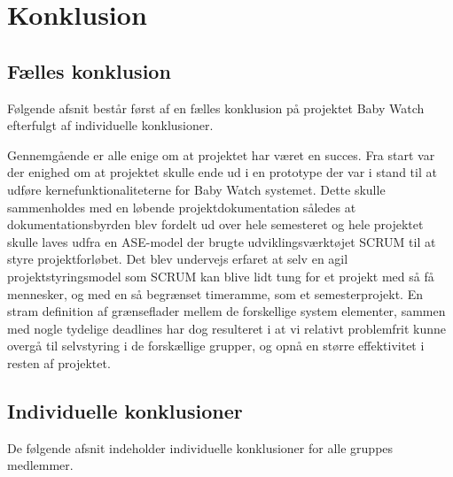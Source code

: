 \chapter{Konklusion}
\section{Fælles konklusion}
Følgende afsnit består først af en fælles konklusion på projektet Baby Watch efterfulgt af individuelle konklusioner.

Gennemgående er alle enige om at projektet har været en succes. Fra start var der enighed om at projektet skulle ende ud i en prototype der var i stand til at udføre kernefunktionaliteterne for Baby Watch systemet. Dette skulle sammenholdes med en løbende projektdokumentation således at dokumentationsbyrden blev fordelt ud over hele semesteret og hele projektet skulle laves udfra en ASE-model der brugte udviklingsværktøjet SCRUM til at styre projektforløbet. Det blev undervejs erfaret at selv en agil projektstyringsmodel som SCRUM kan blive lidt tung for et projekt med så få mennesker, og med en så begrænset timeramme, som et semesterprojekt. En stram definition af grænseflader mellem de forskellige system elementer, sammen med nogle tydelige deadlines har dog resulteret i at vi relativt problemfrit kunne overgå til selvstyring i de forskællige grupper, og opnå en større effektivitet i resten af projektet. 


\section{Individuelle konklusioner}

De følgende afsnit indeholder individuelle konklusioner for alle gruppes medlemmer.












